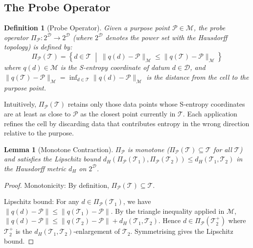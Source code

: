 \documentclass[10pt,twocolumn]{article}
\newtheorem{lemma}[theorem]{Lemma}
\newtheorem{definition}[theorem]{Definition}
\newcommand{\ProbeOp}{\Pi_\mathcal{P}}
\newcommand{\TruthCell}{\mathcal{T}}
\newcommand{\PurposePoint}{\mathcal{P}}
\newcommand{\DataSpace}{\mathcal{D}}
\newcommand{\ManifoldM}{\mathcal{M}}
\begin{document}
\subsection{The Probe Operator}

\begin{definition}[Probe Operator]
\label{def:probe}
Given a purpose point $\PurposePoint \in \ManifoldM$,
the \emph{probe operator} $\ProbeOp : 2^\DataSpace \to 2^\DataSpace$
(where $2^\DataSpace$ denotes the power set with the Hausdorff topology)
is defined by:
\begin{equation}
\ProbeOp(\TruthCell) = \left\{
  d \in \TruthCell \;\middle|\;
  \|q(d) - \PurposePoint\|_{\ManifoldM} \leq \|q(\TruthCell) - \PurposePoint\|_{\ManifoldM}
\right\}
\label{eq:probe-def}
\end{equation}
where $q(d) \in \ManifoldM$ is the S-entropy coordinate of datum $d \in \DataSpace$,
and $\|q(\TruthCell) - \PurposePoint\|_{\ManifoldM} = \inf_{d \in \TruthCell} \|q(d) - \PurposePoint\|_{\ManifoldM}$
is the distance from the cell to the purpose point.
\end{definition}

Intuitively, $\ProbeOp(\TruthCell)$ retains only those data points whose
S-entropy coordinates are at least as close to $\PurposePoint$ as the
closest point currently in $\TruthCell$.
Each application refines the cell by discarding data that contributes
entropy in the wrong direction relative to the purpose.

\begin{lemma}[Monotone Contraction]
\label{lem:monotone}
$\ProbeOp$ is monotone ($\ProbeOp(\TruthCell) \subseteq \TruthCell$ for all $\TruthCell$)
and satisfies the Lipschitz bound
$d_H(\ProbeOp(\TruthCell_1), \ProbeOp(\TruthCell_2)) \leq d_H(\TruthCell_1, \TruthCell_2)$
in the Hausdorff metric $d_H$ on $2^\DataSpace$.
\end{lemma}

\begin{proof}
Monotonicity: By definition, $\ProbeOp(\TruthCell) \subseteq \TruthCell$.

Lipschitz bound: For any $d \in \ProbeOp(\TruthCell_1)$,
we have $\|q(d) - \PurposePoint\| \leq \|q(\TruthCell_1) - \PurposePoint\|$.
By the triangle inequality applied in $\ManifoldM$,
$\|q(d) - \PurposePoint\| \leq \|q(\TruthCell_2) - \PurposePoint\| + d_H(\TruthCell_1, \TruthCell_2)$.
Hence $d \in \ProbeOp(\TruthCell_2^+)$ where $\TruthCell_2^+$ is the
$d_H(\TruthCell_1, \TruthCell_2)$-enlargement of $\TruthCell_2$.
Symmetrising gives the Lipschitz bound.
\end{proof}
\end{document}
